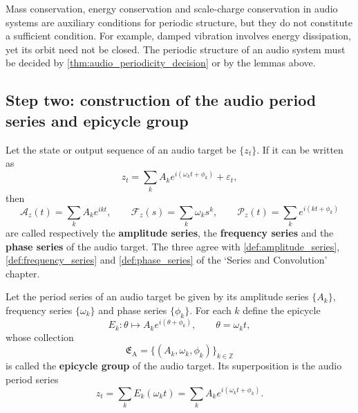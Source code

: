 \begin{remark}\label{rem:audio_invariant_not_period}
Mass conservation, energy conservation and scale-charge conservation in audio systems are auxiliary conditions for periodic structure, but they do not constitute a sufficient condition. For example, damped vibration involves energy dissipation, yet its orbit need not be closed. The periodic structure of an audio system must be decided by \cref{thm:audio_periodicity_decision} or by the lemmas above.
\end{remark}

\subsection{Step two: construction of the audio period series and epicycle group}

\begin{definition}\label{def:audio_series}
Let the state or output sequence of an audio target be $\{z_t\}$. If it can be written as
\[
z_t=\sum_k A_k e^{i(\omega_k t+\phi_k)}+\varepsilon_t,
\]
then
\[
\mathcal A_z(t)=\sum_k A_k e^{ikt},\qquad
\mathcal F_z(s)=\sum_k \omega_k s^k,\qquad
\mathcal P_z(t)=\sum_k e^{i(kt+\phi_k)}
\]
are called respectively the \textbf{amplitude series}, the \textbf{frequency series} and the \textbf{phase series} of the audio target. The three agree with \cref{def:amplitude_series}, \cref{def:frequency_series} and \cref{def:phase_series} of the `Series and Convolution' chapter.
\end{definition}

\begin{definition}\label{def:audio_epicycle_group}
Let the period series of an audio target be given by its amplitude series $\{A_k\}$, frequency series $\{\omega_k\}$ and phase series $\{\phi_k\}$. For each $k$ define the epicycle
\[
E_k:\theta\mapsto A_k e^{i(\theta+\phi_k)},\qquad \theta=\omega_k t,
\]
whose collection
\[
\mathfrak E_{\mathrm{A}}=\{(A_k,\omega_k,\phi_k)\}_{k\in\mathbb Z}
\]
is called the \textbf{epicycle group} of the audio target. Its superposition is the audio period series
\[
z_t=\sum_k E_k(\omega_k t)=\sum_k A_k e^{i(\omega_k t+\phi_k)}.
\]
\end{definition}

